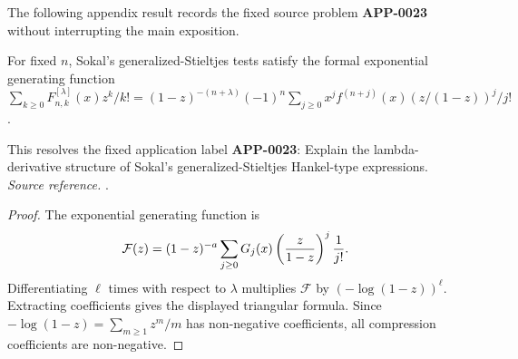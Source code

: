 The following appendix result records the fixed source problem \textbf{APP-0023} without interrupting the main exposition.
\begin{corollary}
\label{res:sokal-gs-lambda-derivative-generating-function}
For fixed \(n\), Sokal's generalized-Stieltjes tests satisfy the formal exponential generating function \(\sum_{k\ge0}F^{[\lambda]}_{n,k}(x)z^k/k!=(1-z)^{-(n+\lambda)}(-1)^n\sum_{j\ge0}x^j f^{(n+j)}(x)(z/(1-z))^j/j!\).

This resolves the fixed application label \textbf{APP-0023}: Explain the lambda-derivative structure of Sokal's generalized-Stieltjes Hankel-type expressions.
\emph{Source reference.} \cite{app-app-0023-source}.
\end{corollary}
\begin{proof}
The exponential generating function is
\[
 \mathcal F(z)
 =(1-z)^{-a}\sum_{j\ge0}G_j(x)
      \left({z\over 1-z}\right)^j{1\over j!}.
\]
Differentiating \(\ell\) times with respect to \(\lambda\) multiplies
\(\mathcal F\) by \((-\log(1-z))^\ell\).  Extracting coefficients gives the
displayed triangular formula.  Since
\(-\log(1-z)=\sum_{m\ge1}z^m/m\) has non-negative coefficients, all compression
coefficients are non-negative.
\end{proof}


